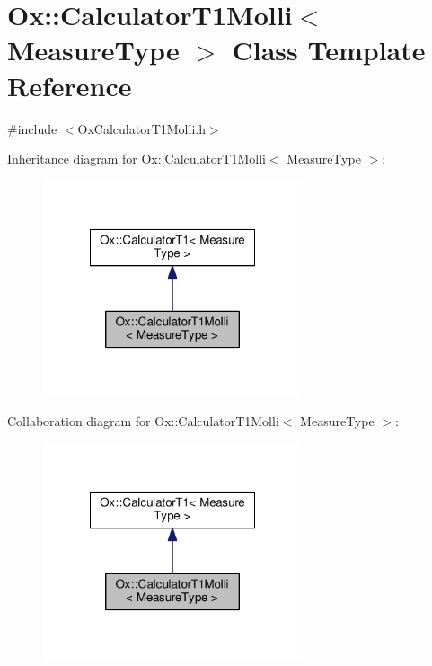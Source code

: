 \hypertarget{class_ox_1_1_calculator_t1_molli}{\section{Ox\-:\-:Calculator\-T1\-Molli$<$ Measure\-Type $>$ Class Template Reference}
\label{class_ox_1_1_calculator_t1_molli}
}


{\ttfamily \#include $<$Ox\-Calculator\-T1\-Molli.\-h$>$}



Inheritance diagram for Ox\-:\-:Calculator\-T1\-Molli$<$ Measure\-Type $>$\-:
\nopagebreak
\begin{figure}[H]
\begin{center}
\leavevmode
\includegraphics[width=216pt]{class_ox_1_1_calculator_t1_molli__inherit__graph}
\end{center}
\end{figure}


Collaboration diagram for Ox\-:\-:Calculator\-T1\-Molli$<$ Measure\-Type $>$\-:
\nopagebreak
\begin{figure}[H]
\begin{center}
\leavevmode
\includegraphics[width=216pt]{class_ox_1_1_calculator_t1_molli__coll__graph}
\end{center}
\end{figure}
